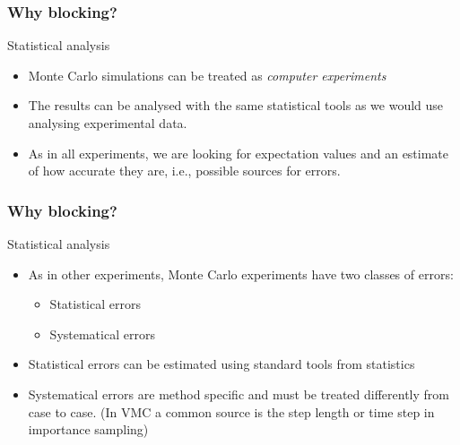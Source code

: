 \documentclass{beamer}
\begin{document}
\begin{frame}
\frametitle{Why blocking?}

\begin{block}{Statistical analysis }
\begin{itemize}
    \item Monte Carlo simulations can be treated as \emph{computer experiments}

    \item The results can be analysed with the same statistical tools as we would use analysing experimental data.

    \item As in all experiments, we are looking for expectation values and an estimate of how accurate they are, i.e., possible sources for errors.
\end{itemize}

\noindent
\end{block}
\end{frame}

\begin{frame}
\frametitle{Why blocking?}

\begin{block}{Statistical analysis }
\begin{itemize}
    \item As in other experiments, Monte Carlo experiments have two classes of errors:
\begin{itemize}

      \item Statistical errors

      \item Systematical errors

\end{itemize}

\noindent
    \item Statistical errors can be estimated using standard tools from statistics

    \item Systematical errors are method specific and must be treated differently from case to case. (In VMC a common source is the step length or time step in importance sampling)
\end{itemize}

\noindent
\end{block}
\end{frame}
\end{document}

